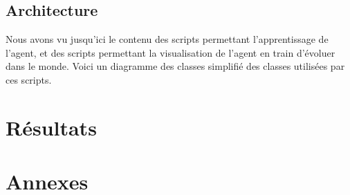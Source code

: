 \documentclass[11pt,a4paper]{report}
\begin{document}
  \section{Architecture}
  
  \par Nous avons vu jusqu'ici le contenu des scripts permettant l'apprentissage de l'agent, et des scripts permettant la visualisation de l'agent en train d'évoluer dans le monde. Voici un diagramme des classes simplifié des classes utilisées par ces scripts. 
  
  

  \chapter{Résultats}
  
  \chapter{Annexes}
       
\end{document}
